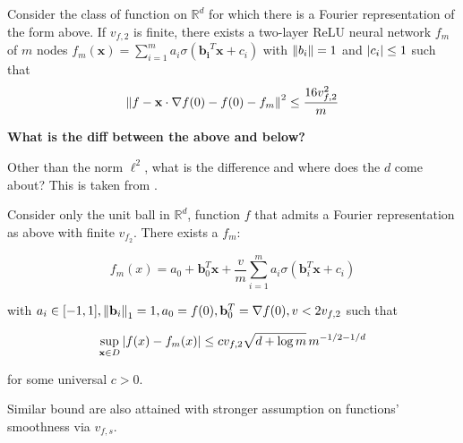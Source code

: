 \begin{theorem}\label{thm:appr_f2}
    Consider the class of function on $\mathbb{R}^d$ for which there is a
    Fourier representation of the form above. If $v_{f, 2}$ is finite, there
    exists a two-layer ReLU neural network $f_m$ of $m$ nodes $f_m(\mathbf{x})
        = \sum_{i=1}^m a_i \sigma(\mathbf{b_i}^T\mathbf{x} + c_i)$ with $\left\| b_i \right\|
        = 1$ and $\left| c_i \right|\leq 1$ such that
    \begin{equation}
        \left\| f
            - \mathbf{x} \cdot \nabla f(0)
            - f(0)
            - f_m \right\|^2 \leq \frac{16 v_{f, 2}^2}{m}
    \end{equation}
\end{theorem}

\textbf{What is the diff between the above and below?}

Other than the norm $\ell^2$, what is the difference and where does the $d$ come
about? This is taken from \cite{klusowskiApproximationCombinationsReLU2018}.

\begin{theorem}
    Consider only the unit ball in $\mathbb{R}^d$, function $f$ that admits a
    Fourier representation as above with finite $v_{f_2}$. There exists a $f_m$:

    \begin{equation}
        f_m(x) = a_0 + \mathbf{b}_0^T \mathbf{x} + \frac{v}{m} \sum_{i=1}^m a_i \sigma(\mathbf{b}_i^T\mathbf{x} + c_i)
    \end{equation}

    with $a_i \in [-1,1], \left\| \mathbf{b}_i \right\|_1 = 1, a_0 = f(0), \mathbf{b}_0^T
        = \nabla f(0), v < 2v_{f,2}$ such that


    \begin{equation}
        \sup_{\mathbf{x} \in D} \left| f(x) - f_m(x) \right| \leq c v_{f,2} \sqrt{d+\log{m}} \, m^{-1/2-1/d}
    \end{equation}

    for some universal $c > 0$.
\end{theorem}

Similar bound are also attained with stronger assumption on functions'
smoothness via $v_{f,s}$.

